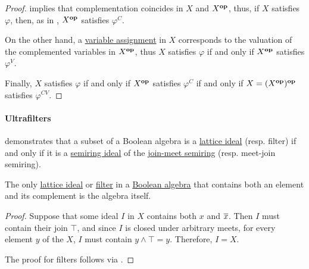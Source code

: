 \begin{proof}
   implies that complementation coincides in \( X \) and \( X^\oppos \), thus, if \( X \) satisfies \( \varphi \), then, as in , \( X^\oppos \) satisfies \( \varphi^C \).

  On the other hand, a \hyperref[def:first_order_valuation/variable_assignment]{variable assignment} in \( X \) corresponds to the valuation of the complemented variables in \( X^\oppos \), thus \( X \) satisfies \( \varphi \) if and only if \( X^\oppos \) satisfies \( \varphi^V \).

  Finally, \( X \) satisfies \( \varphi \) if and only if \( X^\oppos \) satisfies \( \varphi^C \) if and only if \( X = (X^\oppos)^\oppos \) satisfies \( \varphi^{CV} \).
\end{proof}

\paragraph{Ultrafilters}

\begin{remark}\label{rem:boolean_algebra_ideal}
   demonstrates that a subset of a Boolean algebra is a \hyperref[def:lattice_ideal]{lattice ideal} (resp. filter) if and only if it is a \hyperref[def:semiring_ideal]{semiring ideal} of the \hyperref[ex:def:semiring/lattice]{join-meet semiring} (resp. meet-join semiring).
\end{remark}

\begin{proposition}\label{thm:improper_boolean_ideal}
  The only \hyperref[def:lattice_ideal]{lattice ideal} or \hyperref[def:lattice_ideal]{filter} in a \hyperref[def:boolean_algebra]{Boolean algebra} that contains both an element and its complement is the algebra itself.
\end{proposition}
\begin{proof}
  Suppose that some ideal \( I \) in \( X \) contains both \( x \) and \( \oline x \). Then \( I \) must contain their join \( \top \), and since \( I \) is closed under arbitrary meets, for every element \( y \) of the \( X \), \( I \) must contain \( y \wedge \top = y \). Therefore, \( I = X \).

  The proof for filters follows via .
\end{proof}

